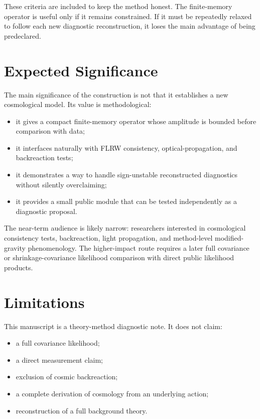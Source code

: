 \documentclass[11pt]{article}
\begin{document}
These criteria are included to keep the method honest. The finite-memory
operator is useful only if it remains constrained. If it must be repeatedly
relaxed to follow each new diagnostic reconstruction, it loses the main
advantage of being predeclared.

\section{Expected Significance}

The main significance of the construction is not that it establishes a new
cosmological model. Its value is methodological:

\begin{itemize}
\item it gives a compact finite-memory operator whose amplitude is bounded before comparison with data;
\item it interfaces naturally with FLRW consistency, optical-propagation, and backreaction tests;
\item it demonstrates a way to handle sign-unstable reconstructed diagnostics without silently overclaiming;
\item it provides a small public module that can be tested independently as a diagnostic proposal.
\end{itemize}

The near-term audience is likely narrow: researchers interested in
cosmological consistency tests, backreaction, light propagation, and
method-level modified-gravity phenomenology. The higher-impact route requires
a later full covariance or shrinkage-covariance likelihood comparison with
direct public likelihood products.

\section{Limitations}

This manuscript is a theory-method diagnostic note. It does not claim:

\begin{itemize}
\item a full covariance likelihood;
\item a direct measurement claim;
\item exclusion of cosmic backreaction;
\item a complete derivation of cosmology from an underlying action;
\item reconstruction of a full background theory.
\end{itemize}
\end{document}
